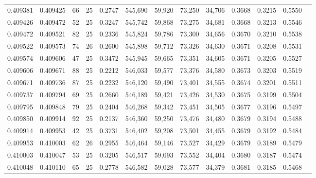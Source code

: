 \begin{tabular}{rrrrrrrrrrrrr}
0.409381 & 0.409425 &    66 &  25 &                                     0.2747 & 545,690 &  59,920 &  73,250 &  34,706 & 0.3668 & 0.3215 & 0.5550 \\
0.409426 & 0.409472 &    52 &  25 &                                     0.3247 & 545,742 &  59,868 &  73,275 &  34,681 & 0.3668 & 0.3213 & 0.5546 \\
0.409472 & 0.409521 &    82 &  25 &                                     0.2336 & 545,824 &  59,786 &  73,300 &  34,656 & 0.3670 & 0.3210 & 0.5538 \\
0.409522 & 0.409573 &    74 &  26 &                                     0.2600 & 545,898 &  59,712 &  73,326 &  34,630 & 0.3671 & 0.3208 & 0.5531 \\
0.409574 & 0.409606 &    47 &  25 &                                     0.3472 & 545,945 &  59,665 &  73,351 &  34,605 & 0.3671 & 0.3205 & 0.5527 \\
0.409606 & 0.409671 &    88 &  25 &                                     0.2212 & 546,033 &  59,577 &  73,376 &  34,580 & 0.3673 & 0.3203 & 0.5519 \\
0.409671 & 0.409736 &    87 &  25 &                                     0.2232 & 546,120 &  59,490 &  73,401 &  34,555 & 0.3674 & 0.3201 & 0.5511 \\
0.409737 & 0.409794 &    69 &  25 &                                     0.2660 & 546,189 &  59,421 &  73,426 &  34,530 & 0.3675 & 0.3199 & 0.5504 \\
0.409795 & 0.409848 &    79 &  25 &                                     0.2404 & 546,268 &  59,342 &  73,451 &  34,505 & 0.3677 & 0.3196 & 0.5497 \\
0.409850 & 0.409914 &    92 &  25 &                                     0.2137 & 546,360 &  59,250 &  73,476 &  34,480 & 0.3679 & 0.3194 & 0.5488 \\
0.409914 & 0.409953 &    42 &  25 &                                     0.3731 & 546,402 &  59,208 &  73,501 &  34,455 & 0.3679 & 0.3192 & 0.5484 \\
0.409953 & 0.410003 &    62 &  26 &                                     0.2955 & 546,464 &  59,146 &  73,527 &  34,429 & 0.3679 & 0.3189 & 0.5479 \\
0.410003 & 0.410047 &    53 &  25 &                                     0.3205 & 546,517 &  59,093 &  73,552 &  34,404 & 0.3680 & 0.3187 & 0.5474 \\
0.410048 & 0.410110 &    65 &  25 &                                     0.2778 & 546,582 &  59,028 &  73,577 &  34,379 & 0.3681 & 0.3185 & 0.5468 \\

\end{tabular}
